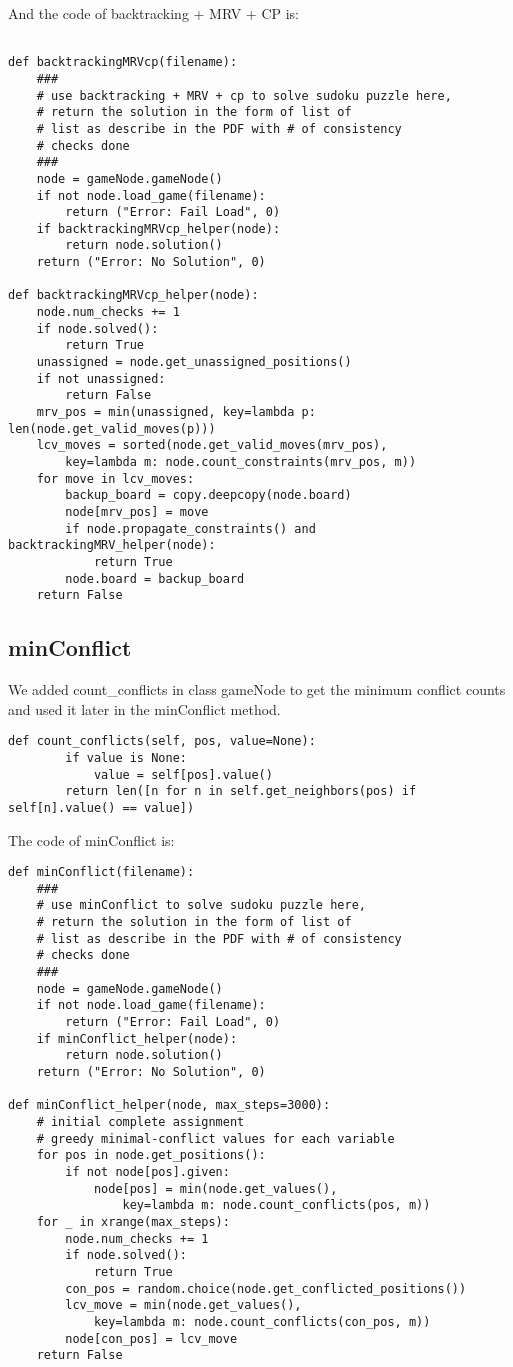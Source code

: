 \documentclass[11pt]{article}
\begin{document}
And the code of backtracking + MRV + CP is:

\lstset{language=Python}
\begin{lstlisting}[frame=single]

def backtrackingMRVcp(filename):
	###
	# use backtracking + MRV + cp to solve sudoku puzzle here,
	# return the solution in the form of list of
	# list as describe in the PDF with # of consistency
	# checks done
	###
	node = gameNode.gameNode()
	if not node.load_game(filename):
		return ("Error: Fail Load", 0)
	if backtrackingMRVcp_helper(node):
		return node.solution()
	return ("Error: No Solution", 0)

def backtrackingMRVcp_helper(node):
	node.num_checks += 1
	if node.solved():
		return True
	unassigned = node.get_unassigned_positions()
	if not unassigned:
		return False
	mrv_pos = min(unassigned, key=lambda p: len(node.get_valid_moves(p)))
	lcv_moves = sorted(node.get_valid_moves(mrv_pos),
		key=lambda m: node.count_constraints(mrv_pos, m))
	for move in lcv_moves:
		backup_board = copy.deepcopy(node.board)
		node[mrv_pos] = move
		if node.propagate_constraints() and backtrackingMRV_helper(node):
			return True
		node.board = backup_board
	return False
\end{lstlisting}

\subsection{minConflict}

We added count\_conflicts in class gameNode to get the minimum conflict counts and used it later in the minConflict method.
\lstset{language=Python}
\begin{lstlisting}[frame=single]
	def count_conflicts(self, pos, value=None):
		if value is None:
			value = self[pos].value()
		return len([n for n in self.get_neighbors(pos) if self[n].value() == value])
\end{lstlisting}

The code of minConflict is:
\lstset{language=Python}
\begin{lstlisting}[frame=single]
def minConflict(filename):
	###
	# use minConflict to solve sudoku puzzle here,
	# return the solution in the form of list of
	# list as describe in the PDF with # of consistency
	# checks done
	###
	node = gameNode.gameNode()
	if not node.load_game(filename):
		return ("Error: Fail Load", 0)
	if minConflict_helper(node):
		return node.solution()
	return ("Error: No Solution", 0)

def minConflict_helper(node, max_steps=3000):
	# initial complete assignment
	# greedy minimal-conflict values for each variable
	for pos in node.get_positions():
		if not node[pos].given:
			node[pos] = min(node.get_values(),
				key=lambda m: node.count_conflicts(pos, m))
	for _ in xrange(max_steps):
		node.num_checks += 1
		if node.solved():
			return True
		con_pos = random.choice(node.get_conflicted_positions())
		lcv_move = min(node.get_values(),
			key=lambda m: node.count_conflicts(con_pos, m))
		node[con_pos] = lcv_move
	return False
\end{lstlisting}
\end{document}
